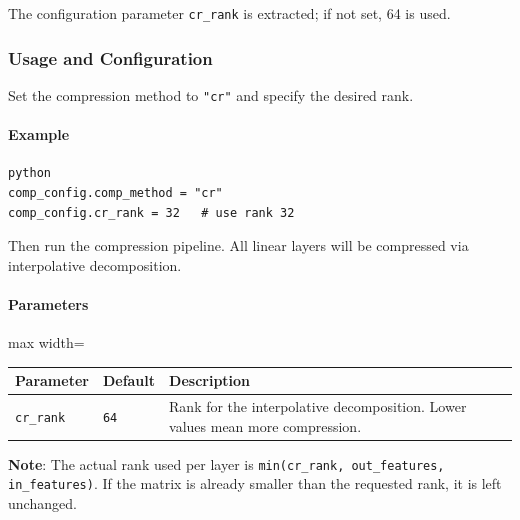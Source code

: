 The configuration parameter \texttt{cr\_rank} is extracted; if not set, 64 is used.


\subsubsection*{Usage and Configuration}

Set the compression method to \texttt{"cr"} and specify the desired rank.

\paragraph{Example}

\vspace{0.5em}
\begin{mdframed}[backgroundcolor=codebg, linecolor=codeframe, linewidth=1pt, roundcorner=4pt, innerleftmargin=2pt, innerrightmargin=5pt, innertopmargin=5pt, innerbottommargin=5pt]
\begin{lstlisting}
python
comp_config.comp_method = "cr"
comp_config.cr_rank = 32   # use rank 32
\end{lstlisting}
\end{mdframed}
\vspace{0.5em}

Then run the compression pipeline. All linear layers will be compressed via interpolative decomposition.

\paragraph{Parameters}

\begin{center}
\begin{adjustbox}{max width=\columnwidth}
\renewcommand{\arraystretch}{1.2}
\begin{tabular}{lll}
\toprule
Parameter & Default & Description \\
\midrule
\texttt{cr\_rank} & \texttt{64} & Rank for the interpolative decomposition. Lower values mean more compression. \\

\bottomrule
\end{tabular}
\end{adjustbox}
\end{center}
\textbf{Note}: The actual rank used per layer is \texttt{min(cr\_rank, out\_features, in\_features)}. If the matrix is already smaller than the requested rank, it is left unchanged.


